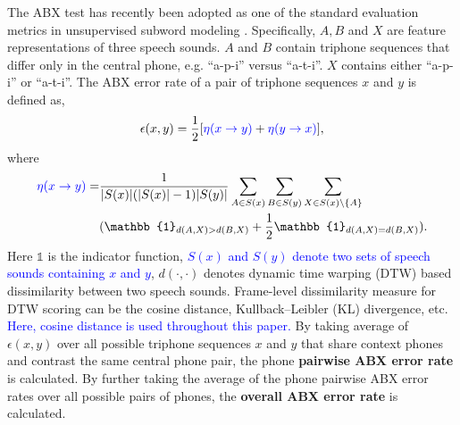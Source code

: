 \documentclass[transmag]{IEEEtran}
\begin{document}
The ABX test has recently been adopted as one of the standard evaluation metrics in unsupervised subword modeling  \cite{versteegh2015zero,dunbar2017zero,Dunbar2019}.
Specifically, $A, B$ and $X$ are feature representations of three speech sounds.  $A$ and $B$ contain triphone sequences that differ only in the central phone, e.g. ``a-p-i'' versus ``a-t-i''. $X$ contains either ``a-p-i'' or ``a-t-i''. 
The ABX error rate of a pair of triphone sequences $x$ and $y$ is defined as,
\begin{equation}
    \epsilon (x, y) = \frac{1}{2}[ \textcolor{blue}{\eta(x \rightarrow y)} + \textcolor{blue}{\eta (y \rightarrow x)}],
    \label{eqt:abx_error_rate_triphones}
\end{equation}
where 
\begin{equation}
\begin{split}
 \textcolor{blue}{\eta(x \rightarrow y)} =& \frac{1}{\vert S(x) \vert (\vert S(x) \vert-1) \vert S(y) \vert} \sum_{A \in S(x)} \sum_{B \in S(y)}\sum_{X \in S(x) \backslash \{A\}} \\
 &(\mathbb{1}_{d(A,X) > d(B,X)} + \frac{1}{2} \mathbb{1}_{d(A,X) = d(B,X)}).
\end{split}
\label{eqt:abx_error_rate_triphone_asym}
\end{equation}
Here $\mathbb{1}$ is the indicator function, \textcolor{blue}{$S(x)$ and $S(y)$ denote two sets of speech sounds containing $x$ and $y$}, $d(\cdot, \cdot)$ denotes dynamic time warping (DTW) based dissimilarity between two speech sounds. Frame-level dissimilarity measure for DTW scoring can be the cosine distance, Kullback–Leibler (KL) divergence, etc. 
\textcolor{blue}{Here, cosine distance is used throughout this paper.}
By taking average of $\epsilon(x,y)$ over all possible triphone sequences $x$ and $y$ that share context phones and contrast the same central phone pair, the phone \textbf{pairwise ABX error rate} is calculated. By further taking the average of the phone pairwise ABX error rates over all possible pairs of phones, the \textbf{overall ABX error rate} is calculated.
\end{document}
